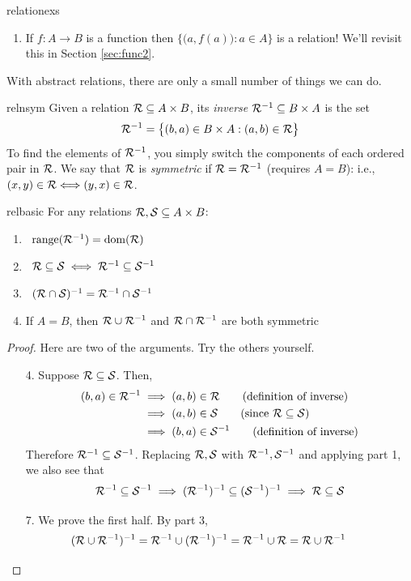 \begin{examples}{}{relationexs}
\begin{enumerate}
	  \item\label{ex:relationexs7} If $f:A\to B$ is a function then $\bigl\{\bigl(a,f(a)\bigr):a\in A\bigr\}$ is a relation! We'll revisit this in Section \ref{sec:func2}.
	\end{enumerate}
\end{examples}

\goodbreak

With abstract relations, there are only a small number of things we can do.

\begin{defn}{}{relnsym}
	Given a relation $\mathcal{R}\subseteq A\times B$, its \emph{inverse} $\mathcal{R}^{-1}\subseteq B\times A$ is the set
	\[
		\mathcal{R}^{-1}=\bigl\{(b,a)\in B\times A:(a,b)\in\mathcal{R}\bigr\}
	\]
	To find the elements of $\mathcal{R}^{-1}$, you simply switch the components of each ordered pair in $\mathcal{R}$.\smallbreak
	We say that $\mathcal{R}$ is \emph{symmetric} if $\mathcal{R}=\mathcal{R}^{-1}$ (requires $A=B$): i.e., $(x,y)\in \mathcal{R}\Longleftrightarrow (y,x)\in \mathcal{R}$.
\end{defn}

\begin{thm}{}{relbasic}
	For any relations $\mathcal{R},\mathcal{S}\subseteq A\times B$:
	\begin{enumerate}\itemsep2pt
	  \item {} \ $\operatorname{range}(\mathcal{R}^{-1})=\operatorname{dom}(\mathcal{R})$
		\setcounter{enumi}{2}
		\item {} \ $\mathcal{R}\subseteq \mathcal{S}\iff \mathcal{R}^{-1}\subseteq \mathcal{S}^{-1}$
		\setcounter{enumi}{4}
		\item {} \ $(\mathcal{R}\cap \mathcal{S})^{-1}=\mathcal{R}^{-1}\cap \mathcal{S}^{-1}$
		\setcounter{enumi}{6}
		\item If $A=B$, then $\mathcal{R}\cup \mathcal{R}^{-1}$ and $\mathcal{R}\cap \mathcal{R}^{-1}$ are both symmetric
	\end{enumerate}
\end{thm}

\begin{proof}
	Here are two of the arguments. Try the others yourself.
	\begin{enumerate}\itemsep0pt
		\item[4.] Suppose $\mathcal{R}\subseteq\mathcal{S}$. Then,
		\begin{align*}
			(b,a)\in\cR^{-1}&\implies (a,b)\in\cR \tag{definition of inverse}\\
			&\implies (a,b)\in\cS \tag{since $\cR\subseteq\cS$}\\
			&\implies (b,a)\in\cS^{-1} \tag{definition of inverse}
		\end{align*}
		Therefore $\mathcal{R}^{-1}\subseteq\mathcal{S}^{-1}$. Replacing $\mathcal{R},\mathcal{S}$ with $\mathcal{R}^{-1},\mathcal{S}^{-1}$ and applying part 1, we also see that
		\[
			\mathcal{R}^{-1}\subseteq\mathcal{S}^{-1}\implies (\mathcal{R}^{-1})^{-1}\subseteq (\mathcal{S}^{-1})^{-1} \implies \mathcal{R}\subseteq \mathcal{S}
		\]
		\item[7.] We prove the first half. By part 3,
		\[
			(\mathcal{R}\cup \mathcal{R}^{-1})^{-1}=\mathcal{R}^{-1}\cup (\mathcal{R}^{-1})^{-1}=\mathcal{R}^{-1}\cup \mathcal{R}=\mathcal{R}\cup \mathcal{R}^{-1} \tag*{\qedhere}
		\]
	\end{enumerate}
\end{proof}


